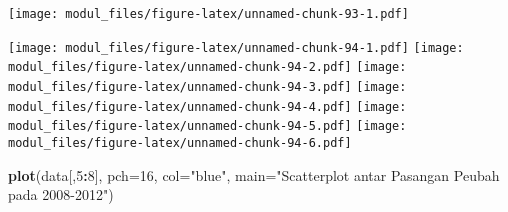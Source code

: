 \documentclass[
]{book}
\newenvironment{Shaded}{\begin{snugshade}}{\end{snugshade}}
\newcommand{\CommentTok}[1]{\textcolor[rgb]{0.56,0.35,0.01}{\textit{#1}}}
\newcommand{\ControlFlowTok}[1]{\textcolor[rgb]{0.13,0.29,0.53}{\textbf{#1}}}
\newcommand{\DataTypeTok}[1]{\textcolor[rgb]{0.13,0.29,0.53}{#1}}
\newcommand{\DecValTok}[1]{\textcolor[rgb]{0.00,0.00,0.81}{#1}}
\newcommand{\FloatTok}[1]{\textcolor[rgb]{0.00,0.00,0.81}{#1}}
\newcommand{\KeywordTok}[1]{\textcolor[rgb]{0.13,0.29,0.53}{\textbf{#1}}}
\newcommand{\NormalTok}[1]{#1}
\newcommand{\OperatorTok}[1]{\textcolor[rgb]{0.81,0.36,0.00}{\textbf{#1}}}
\newcommand{\StringTok}[1]{\textcolor[rgb]{0.31,0.60,0.02}{#1}}
\begin{document}
\begin{Shaded}
\end{Shaded}

\texttt{[image: modul\_files/figure-latex/unnamed-chunk-93-1.pdf]}

\begin{Shaded}
\end{Shaded}

\texttt{[image: modul\_files/figure-latex/unnamed-chunk-94-1.pdf]} \texttt{[image: modul\_files/figure-latex/unnamed-chunk-94-2.pdf]} \texttt{[image: modul\_files/figure-latex/unnamed-chunk-94-3.pdf]} \texttt{[image: modul\_files/figure-latex/unnamed-chunk-94-4.pdf]} \texttt{[image: modul\_files/figure-latex/unnamed-chunk-94-5.pdf]} \texttt{[image: modul\_files/figure-latex/unnamed-chunk-94-6.pdf]}

\begin{Shaded}
\begin{Highlighting}[]
\KeywordTok{plot}\NormalTok{(data[,}\DecValTok{5}\OperatorTok{:}\DecValTok{8}\NormalTok{], }\DataTypeTok{pch=}\DecValTok{16}\NormalTok{, }\DataTypeTok{col=}\StringTok{"blue"}\NormalTok{, }\DataTypeTok{main=}\StringTok{"Scatterplot antar Pasangan Peubah pada 2008{-}2012"}\NormalTok{)}
\end{Highlighting}
\end{Shaded}
\end{document}
